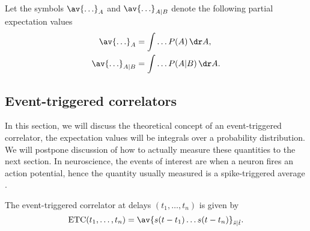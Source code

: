 \documentclass[12pt]{article}
\DeclareMathOperator{\ETC}{ETC}
\begin{document}
\begin{notn}
  Let the symbols $\av{\ldots}_A$ and $\av{\ldots}_{A|B}$ denote the following partial expectation values
  \begin{equation}\label{eq:partialexp}
    \begin{aligned}
      \av{\ldots}_A &= \int\ldots P(A)\,\dr A, \\
      \av{\ldots}_{A|B} &= \int\ldots P(A|B)\,\dr A.
    \end{aligned}
  \end{equation}
\end{notn}


\subsection{Event-triggered correlators}\label{sec:evtrigcorr}

In this section, we will discuss the theoretical concept of an event-triggered correlator, \ie the expectation values will be integrals over a probability distribution.
We will postpone discussion of how to actually measure these quantities to the next section.
In neuroscience, the events of interest are when a neuron fires an action potential, hence the quantity usually measured is a spike-triggered average \cite{DayanAbbot:2001,deBoerKuyper:1968}.

\begin{defn}
  The event-triggered correlator at delays $(t_1,\ldots,t_n)$ is given by
  \begin{equation}\label{eq:evtrigcorr}
    \ETC(t_1,\ldots,t_n) = \av{s(t-t_1)\ldots s(t-t_n)}_{\hat{s}|\hat{t}}.
  \end{equation}
\end{defn}
\end{document}

